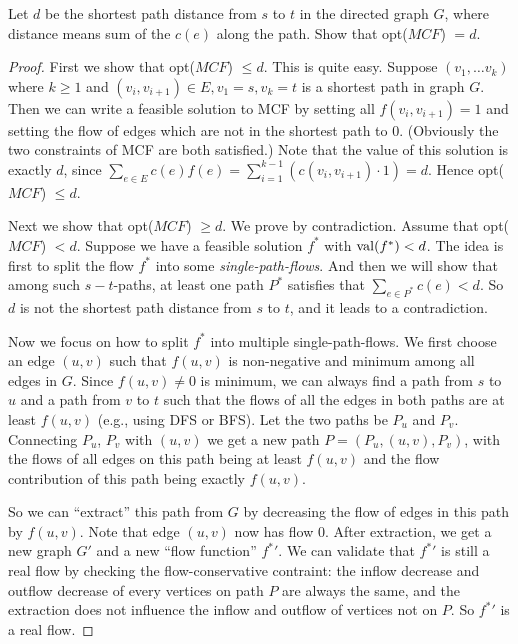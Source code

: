     \newpage
    
    \begin{thm}{}{}
        Let $d$ be the shortest path distance from $s$ to $t$ in the directed graph $G$, where distance means sum of the $c(e)$ along the path. Show that opt($MCF$) $= d$.
    \end{thm}
    
    \begin{proof}
        First we show that opt($MCF$) $\leqslant d$. This is quite easy. Suppose $(v_1, \ldots v_k)$ where $k \geqslant 1$ and $(v_i, v_{i + 1}) \in E, v_1 = s, v_k = t$ is a shortest path in graph $G$. Then we can write a feasible solution to MCF by setting all $f(v_i, v_{i + 1}) = 1$ and setting the flow of edges which are not in the shortest path to $0$. (Obviously the two constraints of MCF are both satisfied.) Note that the value of this solution is exactly $d$, since $\sum_{e \in E} c(e) f(e) = \sum_{i = 1}^{k - 1} (c(v_i, v_{i + 1}) \cdot 1) = d$. Hence opt($MCF$) $\leqslant d$.
        
        Next we show that opt($MCF$) $\geqslant d$. We prove by contradiction. Assume that opt($MCF$) $< d$. Suppose we have a feasible solution $f^*$ with ${\rm val}(f^*) < d$. The idea is first to split the flow $f^*$ into some {\it single-path-flows}. And then we will show that among such $s-t$-paths, at least one path $P^*$ satisfies that $\sum_{e \in P^*} c(e) < d$. So $d$ is not the shortest path distance from $s$ to $t$, and it leads to a contradiction.
        
        \bigskip
        
        Now we focus on how to split $f^*$ into multiple single-path-flows. We first choose an edge $(u, v)$ such that $f(u, v)$ is non-negative and minimum among all edges in $G$. Since $f(u, v) \neq 0$ is minimum, we can always find a path from $s$ to $u$ and a path from $v$ to $t$ such that the flows of all the edges in both paths are at least $f(u, v)$ (e.g., using DFS or BFS). Let the two paths be $P_u$ and $P_v$. Connecting $P_u$, $P_v$ with $(u, v)$ we get a new path $P = \left(P_u, (u, v), P_v\right)$, with the flows of all edges on this path being at least $f(u, v)$ and the flow contribution of this path being exactly $f(u, v)$.
        
        So we can ``extract'' this path from $G$ by decreasing the flow of edges in this path by $f(u, v)$. Note that edge $(u, v)$ now has flow $0$. After extraction, we get a new graph $G'$ and a new ``flow function'' ${f^*}'$. We can validate that ${f^*}'$ is still a real flow by checking the flow-conservative contraint: the inflow decrease and outflow decrease of every vertices on path $P$ are always the same, and the extraction does not influence the inflow and outflow of vertices not on $P$. So ${f^*}'$ is a real flow.
        

\end{proof}
